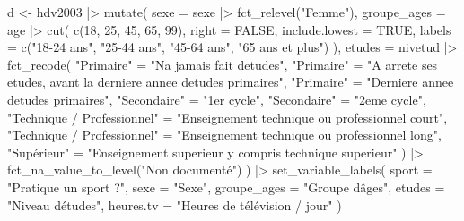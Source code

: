\documentclass[
  letterpaper,
  DIV=11,
  numbers=noendperiod,
  oneside]{scrreprt}
\newenvironment{Shaded}{\begin{snugshade}}{\end{snugshade}}
\newcommand{\AttributeTok}[1]{\textcolor[rgb]{0.40,0.45,0.13}{#1}}
\newcommand{\ConstantTok}[1]{\textcolor[rgb]{0.56,0.35,0.01}{#1}}
\newcommand{\DecValTok}[1]{\textcolor[rgb]{0.68,0.00,0.00}{#1}}
\newcommand{\FunctionTok}[1]{\textcolor[rgb]{0.28,0.35,0.67}{#1}}
\newcommand{\NormalTok}[1]{\textcolor[rgb]{0.00,0.23,0.31}{#1}}
\newcommand{\OtherTok}[1]{\textcolor[rgb]{0.00,0.23,0.31}{#1}}
\newcommand{\SpecialCharTok}[1]{\textcolor[rgb]{0.37,0.37,0.37}{#1}}
\newcommand{\StringTok}[1]{\textcolor[rgb]{0.13,0.47,0.30}{#1}}
\begin{document}
\begin{Shaded}
\begin{Highlighting}[]
\NormalTok{d }\OtherTok{\textless{}{-}}
\NormalTok{  hdv2003 }\SpecialCharTok{|\textgreater{}} 
  \FunctionTok{mutate}\NormalTok{(}
    \AttributeTok{sexe =}\NormalTok{ sexe }\SpecialCharTok{|\textgreater{}} \FunctionTok{fct\_relevel}\NormalTok{(}\StringTok{"Femme"}\NormalTok{),}
    \AttributeTok{groupe\_ages =}\NormalTok{ age }\SpecialCharTok{|\textgreater{}}
      \FunctionTok{cut}\NormalTok{(}
        \FunctionTok{c}\NormalTok{(}\DecValTok{18}\NormalTok{, }\DecValTok{25}\NormalTok{, }\DecValTok{45}\NormalTok{, }\DecValTok{65}\NormalTok{, }\DecValTok{99}\NormalTok{),}
        \AttributeTok{right =} \ConstantTok{FALSE}\NormalTok{,}
        \AttributeTok{include.lowest =} \ConstantTok{TRUE}\NormalTok{,}
        \AttributeTok{labels =} \FunctionTok{c}\NormalTok{(}\StringTok{"18{-}24 ans"}\NormalTok{, }\StringTok{"25{-}44 ans"}\NormalTok{,}
                   \StringTok{"45{-}64 ans"}\NormalTok{, }\StringTok{"65 ans et plus"}\NormalTok{)}
\NormalTok{      ),}
    \AttributeTok{etudes =}\NormalTok{ nivetud }\SpecialCharTok{|\textgreater{}} 
      \FunctionTok{fct\_recode}\NormalTok{(}
        \StringTok{"Primaire"} \OtherTok{=} \StringTok{"N\textquotesingle{}a jamais fait d\textquotesingle{}etudes"}\NormalTok{,}
        \StringTok{"Primaire"} \OtherTok{=} \StringTok{"A arrete ses etudes, avant la derniere annee d\textquotesingle{}etudes primaires"}\NormalTok{,}
        \StringTok{"Primaire"} \OtherTok{=} \StringTok{"Derniere annee d\textquotesingle{}etudes primaires"}\NormalTok{,}
        \StringTok{"Secondaire"} \OtherTok{=} \StringTok{"1er cycle"}\NormalTok{,}
        \StringTok{"Secondaire"} \OtherTok{=} \StringTok{"2eme cycle"}\NormalTok{,}
        \StringTok{"Technique / Professionnel"} \OtherTok{=} \StringTok{"Enseignement technique ou professionnel court"}\NormalTok{,}
        \StringTok{"Technique / Professionnel"} \OtherTok{=} \StringTok{"Enseignement technique ou professionnel long"}\NormalTok{,}
        \StringTok{"Supérieur"} \OtherTok{=} \StringTok{"Enseignement superieur y compris technique superieur"}
\NormalTok{    ) }\SpecialCharTok{|\textgreater{}} 
    \FunctionTok{fct\_na\_value\_to\_level}\NormalTok{(}\StringTok{"Non documenté"}\NormalTok{)  }
\NormalTok{  ) }\SpecialCharTok{|\textgreater{}} 
  \FunctionTok{set\_variable\_labels}\NormalTok{(}
    \AttributeTok{sport =} \StringTok{"Pratique un sport ?"}\NormalTok{,}
    \AttributeTok{sexe =} \StringTok{"Sexe"}\NormalTok{,}
    \AttributeTok{groupe\_ages =} \StringTok{"Groupe d\textquotesingle{}âges"}\NormalTok{,}
    \AttributeTok{etudes =} \StringTok{"Niveau d\textquotesingle{}études"}\NormalTok{,}
    \AttributeTok{heures.tv =} \StringTok{"Heures de télévision / jour"}
\NormalTok{  )}
\end{Highlighting}
\end{Shaded}
\end{document}
